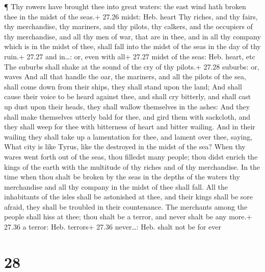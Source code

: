  ¶ Thy rowers have brought thee into great waters: the east
wind hath broken thee in the midst of the seas.+ 27.26 midst: Heb. heart
 Thy riches, and thy fairs, thy merchandise, thy mariners,
and thy pilots, thy calkers, and the occupiers of thy merchandise, and
all thy men of war, that are in thee, and in all thy company which is in
the midst of thee, shall fall into the midst of the seas in the day of
thy ruin.+ 27.27 and in\ldots: or, even with all+ 27.27 midst of the
seas: Heb. heart, etc  The suburbs shall shake at the sound
of the cry of thy pilots.+ 27.28 suburbs: or, waves  And
all that handle the oar, the mariners, and all the pilots of the sea,
shall come down from their ships, they shall stand upon the land;
 And shall cause their voice to be heard against thee, and
shall cry bitterly, and shall cast up dust upon their heads, they shall
wallow themselves in the ashes:  And they shall make
themselves utterly bald for thee, and gird them with sackcloth, and they
shall weep for thee with bitterness of heart and bitter wailing.
 And in their wailing they shall take up a lamentation for
thee, and lament over thee, saying, What city is like Tyrus, like the
destroyed in the midst of the sea?  When thy wares went
forth out of the seas, thou filledst many people; thou didst enrich the
kings of the earth with the multitude of thy riches and of thy
merchandise.  In the time when thou shalt be broken by the
seas in the depths of the waters thy merchandise and all thy company in
the midst of thee shall fall.  All the inhabitants of the
isles shall be astonished at thee, and their kings shall be sore afraid,
they shall be troubled in their countenance.  The merchants
among the people shall hiss at thee; thou shalt be a terror, and never
shalt be any more.+ 27.36 a terror: Heb. terrors+ 27.36 never\ldots:
Heb. shalt not be for ever

\hypertarget{section-27}{%
\section{28}\label{section-27}}

